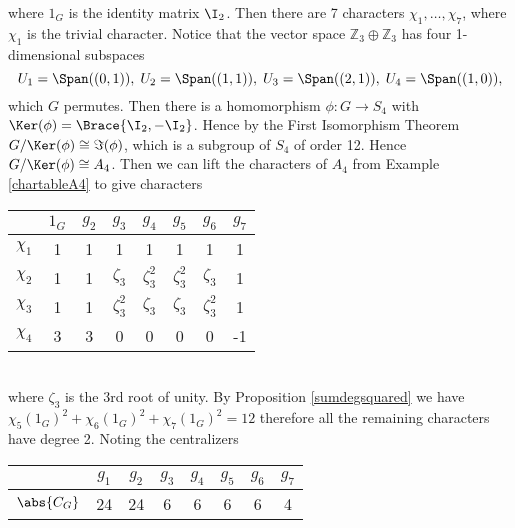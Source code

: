 \documentclass[../Project.tex]{subfiles}
\begin{document}
\begin{exam}[$\SL_2(F_3)$ {\cite[page 439]{2}}]
\begin{mitem}
	\end{mitem}
	where $1_G$ is the identity matrix $\I_2$. Then there are 7 characters $\chi_1,\dots,\chi_7$, where $\chi_1$ is the trivial character. Notice that  the vector space $\mathbb{Z}_3 \oplus \mathbb{Z}_3$ has four 1-dimensional subspaces
	$$U_1 = \Span((0,1)),\;U_2 = \Span((1,1)),\;U_3 = \Span((2,1)),\; U_4 = \Span((1,0)),$$
	which $G$ permutes. Then there is a homomorphism $\phi : G \to S_4$ with $\Ker(\phi) = \Brace{\I_2,-\I_2}$. Hence by the First Isomorphism Theorem $G/\Ker(\phi) \cong \Im(\phi)$, which is a subgroup of $S_4$ of order 12. Hence $G/\Ker(\phi) \cong A_4$. Then we can lift the characters of $A_4$ from Example \ref{chartableA4} to give characters\\

\begin{minipage}{\linewidth}
	\centering
	\begin{tabular}{c | c  c  c  c c c c }
		  $ $ & $1_{G}$ & $g_2$ & $g_3$ & $g_4$ & $g_5$ & $g_6$ & $g_7$\\
	\hline
		$\chi_1$ & 1 & 1 & 1 & 1 & 1 & 1 & 1\\
		$\chi_2$ & 1 & 1 & $\zeta_3$ & $\zeta_3^2$ & $\zeta_3^2$ & $\zeta_3$ & 1\\
		$\chi_3$ & 1 & 1 & $\zeta_3^2$ & $\zeta_3$ & $\zeta_3$ & $\zeta_3^2$ & 1 \\
		$\chi_4$ & 3 & 3 & 0 & 0 & 0 & 0 & -1 \\
	\hline
	\end{tabular}
	\end{minipage}\\

	where $\zeta_3$ is the 3rd root of unity. By Proposition \ref{sumdegsquared} we have $\chi_5(1_G)^2 + \chi_6(1_G)^2 + \chi_7(1_G)^2 = 12$ therefore all the remaining characters have degree 2. Noting the centralizers

	\begin{minipage}{\linewidth}
	\centering
	\begin{tabular}{c | c  c  c  c c c c }
		  $ $ & $g_1$ & $g_2$ & $g_3$ & $g_4$ & $g_5$ & $g_6$ & $g_7$\\
	\hline
		$\abs{C_{G}}$ & 24 & 24 & 6 & 6 & 6 & 6 & 4\\
	\hline
	\end{tabular}
	\end{minipage}\\


\end{exam}
\end{document}
